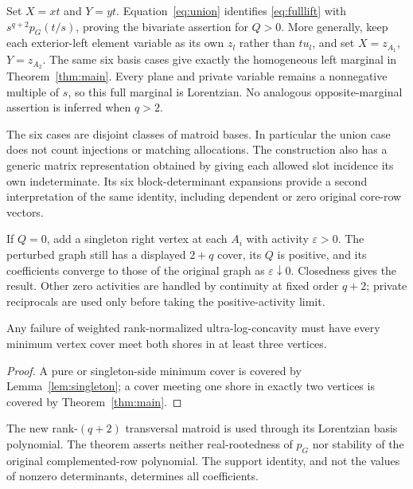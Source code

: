 Set $X=xt$ and $Y=yt$. Equation~\eqref{eq:union} identifies \eqref{eq:fulllift} with $s^{q+2}p_G(t/s)$, proving the bivariate assertion for $Q>0$. More generally, keep each exterior-left element variable as its own $z_l$ rather than $tu_l$, and set $X=z_{A_1}$, $Y=z_{A_2}$. The same six basis cases give exactly the homogeneous left marginal in Theorem~\ref{thm:main}. Every plane and private variable remains a nonnegative multiple of $s$, so this full marginal is Lorentzian. No analogous opposite-marginal assertion is inferred when $q>2$.

The six cases are disjoint classes of matroid bases. In particular the union case does not count injections or matching allocations. The construction also has a generic matrix representation obtained by giving each allowed slot incidence its own indeterminate. Its six block-determinant expansions provide a second interpretation of the same identity, including dependent or zero original core-row vectors.

If $Q=0$, add a singleton right vertex at each $A_i$ with activity $\varepsilon>0$. The perturbed graph still has a displayed $2+q$ cover, its $Q$ is positive, and its coefficients converge to those of the original graph as $\varepsilon\downarrow0$. Closedness gives the result. Other zero activities are handled by continuity at fixed order $q+2$; private reciprocals are used only before taking the positive-activity limit.

\begin{corollary}\label{cor:coverobstruction}
Any failure of weighted rank-normalized ultra-log-concavity must have every minimum vertex cover meet both shores in at least three vertices.
\end{corollary}
\begin{proof}
A pure or singleton-side minimum cover is covered by Lemma~\ref{lem:singleton}; a cover meeting one shore in exactly two vertices is covered by Theorem~\ref{thm:main}.
\end{proof}

\begin{remark}
The new rank-$(q+2)$ transversal matroid is used through its Lorentzian basis polynomial. The theorem asserts neither real-rootedness of $p_G$ nor stability of the original complemented-row polynomial. The support identity, and not the values of nonzero determinants, determines all coefficients.
\end{remark}
